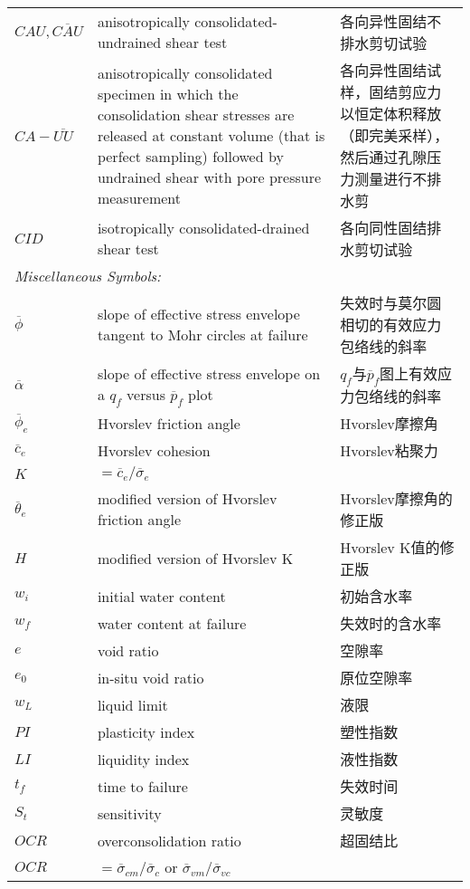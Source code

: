 \begin{appendix}
\begin{longtable}{p{}p{}p{}}
    $CAU,\overline{CAU}$ & anisotropically consolidated-undrained shear test & 各向异性固结不排水剪切试验 \\
    $CA-\overline{UU}$ & anisotropically consolidated specimen in which the consolidation shear stresses are released at constant volume (that is perfect sampling) followed by undrained shear with pore pressure measurement & 各向异性固结试样，固结剪应力以恒定体积释放（即完美采样），然后通过孔隙压力测量进行不排水剪 \\
    $CID$ & isotropically consolidated-drained shear test & 各向同性固结排水剪切试验 \\
    \multicolumn{3}{l}{\emph{Miscellaneous Symbols:}} \\
    $\overline{\phi}$ & slope of effective stress envelope tangent to Mohr circles at failure & 失效时与莫尔圆相切的有效应力包络线的斜率 \\
    $\overline{\alpha}$ & slope of effective stress envelope on a $q_f$ versus $\overline{p}_f$ plot & $q_f$与$\overline{p}_f$图上有效应力包络线的斜率 \\
    $\overline{\phi}_e$ & Hvorslev friction angle & Hvorslev摩擦角 \\
    $\overline{c}_e$ & Hvorslev cohesion & Hvorslev粘聚力 \\
    $K$ & $=\overline{c}_e/\overline{\sigma}_e$ & \\
    $\overline{\theta}_e$ & modified version of Hvorslev friction angle & Hvorslev摩擦角的修正版 \\
    $H$ & modified version of Hvorslev K & Hvorslev K值的修正版 \\
    $w_i$ & initial water content & 初始含水率 \\
    $w_f$ & water content at failure & 失效时的含水率 \\
    $e$ & void ratio & 空隙率 \\
    $e_0$ & in-situ void ratio & 原位空隙率 \\
    $w_L$ & liquid limit & 液限 \\
    $PI$ & plasticity index & 塑性指数 \\
    $LI$ & liquidity index & 液性指数 \\
    $t_f$ & time to failure & 失效时间 \\
    $S_t$ & sensitivity & 灵敏度 \\
    $OCR$ & overconsolidation ratio & 超固结比 \\
    $OCR$ & $=\overline{\sigma}_{cm}/\overline{\sigma}_c$ or $\overline{\sigma}_{vm}/\overline{\sigma}_{vc}$ \\
\end{longtable}

\end{appendix}